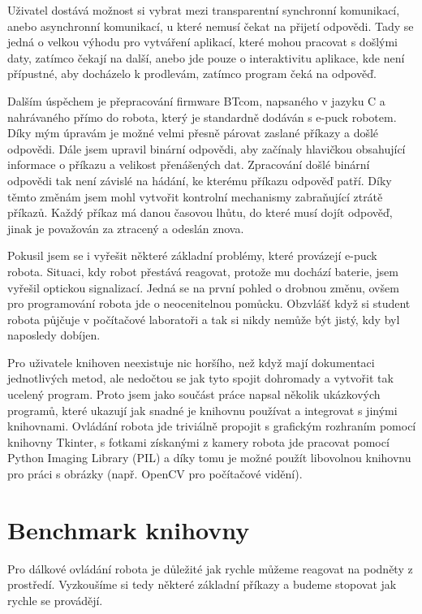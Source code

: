 \documentclass[12pt,notitlepage]{report}
\begin{document}
    Uživatel dostává možnost si vybrat mezi transparentní synchronní
    komunikací, anebo asynchronní komunikací, u které nemusí čekat na přijetí
    odpovědi. Tady se jedná o velkou výhodu pro vytváření aplikací, které mohou
    pracovat s došlými daty, zatímco čekají na další, anebo jde pouze o
    interaktivitu aplikace, kde není přípustné, aby docházelo k prodlevám,
    zatímco program čeká na odpověď.

    Dalším úspěchem je přepracování firmware BTcom, napsaného v jazyku C a
    nahrávaného přímo do robota, který je standardně dodáván s e-puck robotem.
    Díky mým úpravám je možné velmi přesně párovat zaslané příkazy a došlé
    odpovědi. Dále jsem upravil binární odpovědi, aby začínaly hlavičkou
    obsahující informace o příkazu a velikost přenášených dat. Zpracování došlé
    binární odpovědi tak není závislé na hádání, ke kterému příkazu odpověď
    patří. Díky těmto změnám jsem mohl vytvořit kontrolní mechanismy
    zabraňující ztrátě příkazů. Každý příkaz má danou časovou lhůtu, do které
    musí dojít odpověď, jinak je považován za ztracený a odeslán znova.

    Pokusil jsem se i vyřešit některé základní problémy, které provázejí e-puck
    robota. Situaci, kdy robot přestává reagovat, protože mu dochází baterie,
    jsem vyřešil optickou signalizací. Jedná se na první pohled o drobnou
    změnu, ovšem pro programování robota jde o neocenitelnou pomůcku. Obzvlášť
    když si student robota půjčuje v počítačové laboratoři a tak si nikdy
    nemůže být jistý, kdy byl naposledy dobíjen.

    Pro uživatele knihoven neexistuje nic horšího, než když mají dokumentaci
    jednotlivých metod, ale nedočtou se jak tyto spojit dohromady a vytvořit
    tak ucelený program. Proto jsem jako součást práce napsal několik
    ukázkových programů, které ukazují jak snadné je knihovnu používat a
    integrovat s jinými knihovnami. Ovládání robota jde triviálně propojit s
    grafickým rozhraním pomocí knihovny Tkinter, s fotkami získanými z kamery
    robota jde pracovat pomocí Python Imaging Library (PIL) a díky tomu je
    možné použít libovolnou knihovnu pro práci s obrázky (např. OpenCV pro
    počítačové vidění).

    \section{Benchmark knihovny}

    Pro dálkové ovládání robota je důležité jak rychle můžeme reagovat na
    podněty z prostředí. Vyzkoušíme si tedy některé základní příkazy a budeme
    stopovat jak rychle se provádějí.
\end{document}
